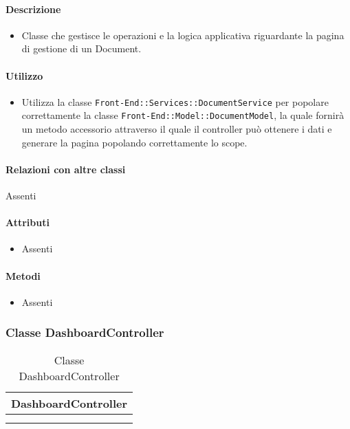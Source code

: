 \paragraph*{Descrizione}
\begin{itemize}
\item[] Classe che gestisce le operazioni e la logica applicativa riguardante la pagina di gestione di un Document.
\end{itemize}

\paragraph*{Utilizzo}
\begin{itemize}
\item[] Utilizza la classe \texttt{Front-End::Services::DocumentService} per popolare correttamente la classe \texttt{Front-End::Model::DocumentModel}, la quale fornirà un metodo accessorio attraverso il quale il controller può ottenere i dati e generare la pagina popolando correttamente lo scope.
\end{itemize}

\paragraph*{Relazioni con altre classi}
Assenti

\paragraph*{Attributi}
\begin{itemize}
\item[] Assenti
\end{itemize}

\paragraph*{Metodi}
\begin{itemize}
\item[] Assenti
\end{itemize}

\subsubsection{Classe DashboardController}

\begin{table}[ht]
\begin{center}
\bgroup
\setlength{\arrayrulewidth}{0.6mm}
\def\arraystretch{1}
\begin{tabular}{ | p{12cm} | }
\hline
\centerline{\textbf{DashboardController}}
\\ \hline
 \\ 
\hline
 \\ 
\hline
\end{tabular}
\egroup
\caption{Classe DashboardController}
\end{center}
\end{table}

